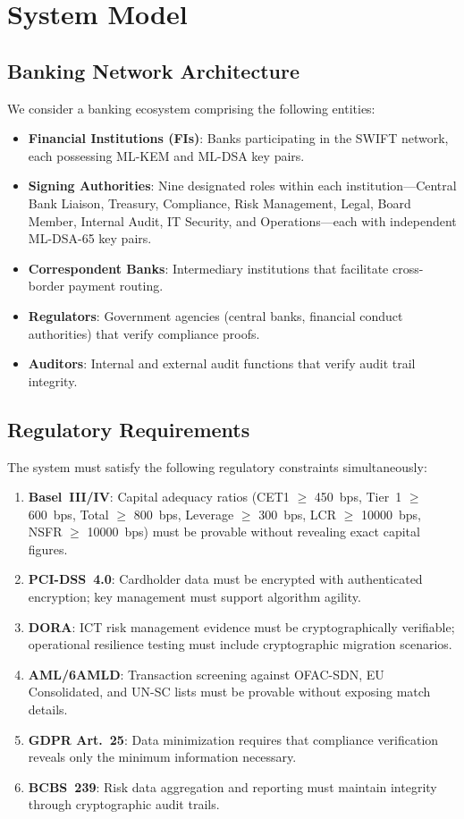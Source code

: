 \documentclass[conference,10pt]{IEEEtran}
\begin{document}
\section{System Model}

\subsection{Banking Network Architecture}

We consider a banking ecosystem comprising the following entities:

\begin{itemize}[leftmargin=*]
\item \textbf{Financial Institutions (FIs)}: Banks participating in the SWIFT network, each possessing ML-KEM and ML-DSA key pairs.
\item \textbf{Signing Authorities}: Nine designated roles within each institution---Central Bank Liaison, Treasury, Compliance, Risk Management, Legal, Board Member, Internal Audit, IT Security, and Operations---each with independent ML-DSA-65 key pairs.
\item \textbf{Correspondent Banks}: Intermediary institutions that facilitate cross-border payment routing.
\item \textbf{Regulators}: Government agencies (central banks, financial conduct authorities) that verify compliance proofs.
\item \textbf{Auditors}: Internal and external audit functions that verify audit trail integrity.
\end{itemize}

\subsection{Regulatory Requirements}

The system must satisfy the following regulatory constraints simultaneously:

\begin{enumerate}[leftmargin=*]
\item \textbf{Basel~III/IV}: Capital adequacy ratios (CET1 $\geq$ 450~bps, Tier~1 $\geq$ 600~bps, Total $\geq$ 800~bps, Leverage $\geq$ 300~bps, LCR $\geq$ 10000~bps, NSFR $\geq$ 10000~bps) must be provable without revealing exact capital figures.
\item \textbf{PCI-DSS~4.0}: Cardholder data must be encrypted with authenticated encryption; key management must support algorithm agility.
\item \textbf{DORA}: ICT risk management evidence must be cryptographically verifiable; operational resilience testing must include cryptographic migration scenarios.
\item \textbf{AML/6AMLD}: Transaction screening against OFAC-SDN, EU Consolidated, and UN-SC lists must be provable without exposing match details.
\item \textbf{GDPR Art.~25}: Data minimization requires that compliance verification reveals only the minimum information necessary.
\item \textbf{BCBS~239}: Risk data aggregation and reporting must maintain integrity through cryptographic audit trails.
\end{enumerate}
\end{document}
